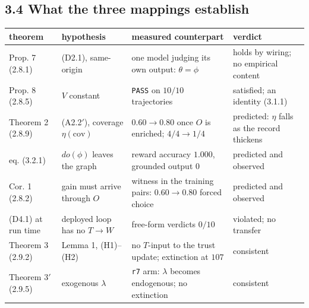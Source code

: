 \documentclass[11pt,a4paper]{article}
\newcounter{none}
\begin{document}
\subsection{3.4 What the three mappings establish}\label{what-the-three-mappings-establish}

{\def\LTcaptype{none} %
\begin{longtable}[]{@{}
  >{\raggedright\arraybackslash}p{}
  >{\raggedright\arraybackslash}p{}
  >{\raggedright\arraybackslash}p{}
  >{\raggedright\arraybackslash}p{}@{}}
\toprule\noalign{}
\begin{minipage}[b]{\linewidth}\raggedright
theorem
\end{minipage} & \begin{minipage}[b]{\linewidth}\raggedright
hypothesis
\end{minipage} & \begin{minipage}[b]{\linewidth}\raggedright
measured counterpart
\end{minipage} & \begin{minipage}[b]{\linewidth}\raggedright
verdict
\end{minipage} \\
\midrule\noalign{}
\endhead
\bottomrule\noalign{}
\endlastfoot
Prop. 7 (2.8.1) & (D2.1), same-origin & one model judging its own output: \(\theta=\phi\) & holds by wiring; no empirical content \\
Prop. 8 (2.8.5) & \(V\) constant & \texttt{PASS} on \(10/10\) trajectories & satisfied; an identity (3.1.1) \\
Theorem 2 (2.8.9) & (A2.2\('\)), coverage \(\eta(\mathrm{cov})\) & \(0.60\to0.80\) once \(O\) is enriched; \(4/4\to1/4\) & predicted: \(\eta\) falls as the record thickens \\
eq. (3.2.1) & \(do(\phi)\) leaves the graph & reward accuracy \(1.000\), grounded output \(0\) & predicted and observed \\
Cor. 1 (2.8.2) & gain must arrive through \(O\) & witness in the training pairs: \(0.60\to0.80\) forced choice & predicted and observed \\
(D4.1) at run time & deployed loop has no \(T\to W\) & free-form verdicts \(0/10\) & violated; no transfer \\
Theorem 3 (2.9.2) & Lemma 1, (H1)--(H2) & no \(T\)-input to the trust update; extinction at \(107\) & consistent \\
Theorem 3\('\) (2.9.5) & exogenous \(\lambda\) & \texttt{r7} arm: \(\lambda\) becomes endogenous; no extinction & consistent \\
\end{longtable}
}
\end{document}
